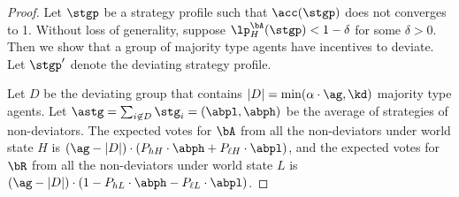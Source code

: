 \begin{proof}
    Let $\stgp$ be a strategy profile such that $\acc(\stgp)$ does not converges to 1. Without loss of generality, suppose $\lp_{H}^{\bA}(\stgp) < 1 - \delta$ for some $\delta > 0$. Then we show that a group of majority type agents have incentives to deviate. Let $\stgp'$ denote the deviating strategy profile.

    Let $D$ be the deviating group that contains $|D| = \min(\alpha\cdot \ag, \kd)$ majority type agents.
    Let $\astg = \sum_{i\not\in D} \stg_i = (\abpl, \abph)$ be the average of strategies of non-deviators. The expected votes for $\bA$ from all the non-deviators under world state $H$ is $(\ag - |D|)\cdot (P_{hH}\cdot \abph + P_{\ell H}\cdot \abpl)$, and the expected votes for $\bR$ from all the non-deviators under world state $L$ is $(\ag - |D|)\cdot (1 - P_{hL}\cdot \abph - P_{\ell L}\cdot \abpl)$.
    


\end{proof}
